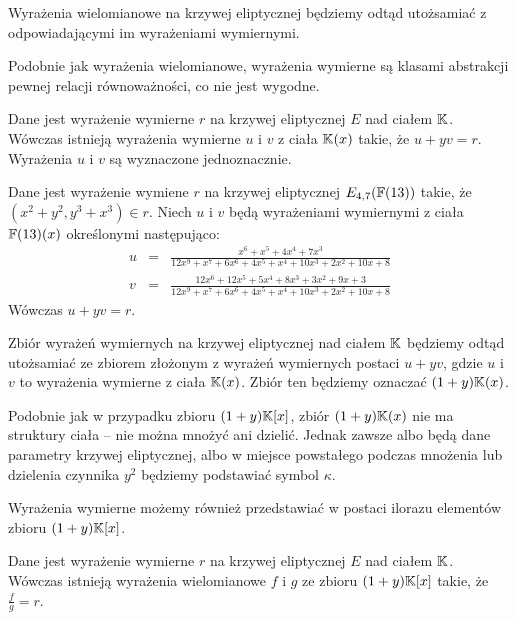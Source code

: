 \begin{remark}
Wyrażenia wielomianowe na krzywej eliptycznej
będziemy odtąd utożsamiać z odpowiadającymi im wyrażeniami wymiernymi.
\end{remark}

\noindent
Podobnie jak wyrażenia wielomianowe,
wyrażenia wymierne są klasami abstrakcji pewnej relacji równoważności,
co nie jest wygodne.

\begin{theorem}
Dane jest wyrażenie wymierne $r$ na krzywej eliptycznej $E$ nad ciałem $\mathbb{K}$.
Wówczas istnieją wyrażenia wymierne $u$ i $v$ z ciała $\mathbb{K}(x)$ takie,
że $u + yv = r$.
Wyrażenia $u$ i $v$ są wyznaczone jednoznacznie.
\end{theorem}

\begin{example}
Dane jest wyrażenie wymiene $r$
na krzywej eliptycznej $E_{4,7}(\mathbb{F}(13))$ takie,
że $(x^2 + y^2, y^3 + x^3) \in r$.
Niech $u$ i $v$ będą wyrażeniami wymiernymi z ciała $\mathbb{F}(13)(x)$
określonymi następująco:
\begin{eqnarray*}
u & = & \frac
    {x^6 + x^5 +4x^4 + 7x^3}
    {12x^9 + x^7 + 6x^6 + 4x^5 + x^4 + 10x^3 + 2x^2 + 10x + 8}
\\
v & = & \frac
    {12x^6 + 12x^5 + 5x^4 + 8x^3 + 3x^2 + 9x + 3}
    {12x^9 + x^7 + 6x^6 + 4x^5 + x^4 + 10x^3 + 2x^2 + 10x + 8}
\end{eqnarray*}
Wówczas $u + yv = r$.
\end{example}

\begin{remark}
Zbiór wyrażeń wymiernych na krzywej eliptycznej nad ciałem $\mathbb{K}$
będziemy odtąd utożsamiać ze zbiorem
złożonym z wyrażeń wymiernych postaci $u + yv$,
gdzie $u$ i $v$ to wyrażenia wymierne z ciała $\mathbb{K}(x)$.
Zbiór ten będziemy oznaczać $(1 + y)\mathbb{K}(x)$.
\end{remark}

\noindent
Podobnie jak w przypadku zbioru $(1 + y)\mathbb{K}[x]$,
zbiór $(1 + y)\mathbb{K}(x)$ nie ma struktury ciała --
nie można mnożyć ani dzielić.
Jednak zawsze albo będą dane parametry krzywej eliptycznej,
albo w miejsce powstałego podczas mnożenia lub dzielenia czynnika $y^2$
będziemy podstawiać symbol $\kappa$.

\noindent
Wyrażenia wymierne możemy również przedstawiać w postaci ilorazu
elementów zbioru $(1 + y)\mathbb{K}[x]$.

\begin{theorem}
Dane jest wyrażenie wymierne $r$ na krzywej eliptycznej $E$ nad ciałem $\mathbb{K}$.
Wówczas istnieją wyrażenia wielomianowe $f$ i $g$
ze zbioru $(1 + y)\mathbb{K}[x]$ takie,
że $\frac{f}{g} = r$.
\end{theorem}

